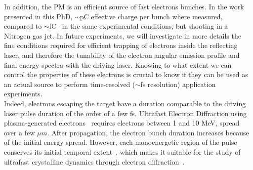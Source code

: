 In addition, the PM is an efficient source of fast electrons bunches. In the work presented in this PhD, $\sim$pC effective charge per bunch where measured, compared to $\sim$fC~\cite{Beaurepaire2015} in the same experimental conditions, but shooting in a Nitrogen gas jet. In future experiments, we will investigate in more details the fine conditions required for efficient trapping of electrons inside the reflecting laser, and therefore the tunability of the electron angular emission profile and final energy spectra with the driving laser. Knowing to what extent we can control the properties of these electrons is crucial to know if they can be used as an actual source to perform time-resolved ($\sim$fs resolution) application experiments.\\

\noindent Indeed, electrons escaping the target have a duration comparable to the driving laser pulse duration of the order of a few fs. Ultrafast Electron Diffraction using plasma-generated electrons~\cite{sciaini2011femtosecond} requires electrons between 1 and 10 MeV, spread over a few $\mu m$. After propagation, the electron bunch duration increases because of the initial energy spread. However, each monoenergetic region of the pulse conserves its initial temporal extent~\cite{faure2015concept}, which makes it suitable for the study of ultrafast crystalline dynamics through electron diffraction~\cite{tokita2010single}.